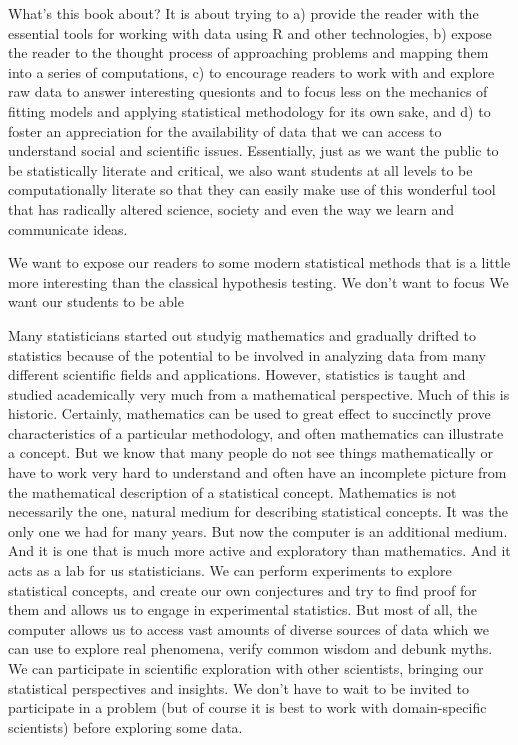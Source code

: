 What's this book about?  It is about trying to a) provide the reader
with the essential tools for working with data using R and other
technologies, b) expose the reader to the thought process of
approaching problems and mapping them into a series of computations,
c) to encourage readers to work with and explore raw data to answer
interesting quesionts and to focus less on the mechanics of fitting
models and applying statistical methodology for its own sake, and d)
to foster an appreciation for the availability of data that we can
access to understand social and scientific issues.  Essentially, just
as we want the public to be statistically literate and critical, we
also want students at all levels to be computationally literate so
that they can easily make use of this wonderful tool that has
radically altered science, society and even the way we learn and
communicate ideas.

We want to expose our readers to some modern statistical
methods that is a little more interesting than the classical
hypothesis testing. We don't want to focus
We want our students to be able 

Many statisticians started out studyig mathematics and gradually
drifted to statistics because of the potential to be involved in
analyzing data from many different scientific fields and applications.
However, statistics is taught and studied academically very much from
a mathematical perspective.  Much of this is historic. Certainly,
mathematics can be used to great effect to succinctly prove
characteristics of a particular methodology, and often mathematics can
illustrate a concept.  But we know that many people do not see things
mathematically or have to work very hard to understand and often have
an incomplete picture from the mathematical description of a
statistical concept.  Mathematics is not necessarily the one, natural
medium for describing statistical concepts.  It was the only one we
had for many years. But now the computer is an additional medium.  And
it is one that is much more active and exploratory than mathematics.
And it acts as a lab for us statisticians.  We can perform experiments
to explore statistical concepts, and create our own conjectures and
try to find proof for them and allows us to engage in experimental
statistics.  But most of all, the computer allows us to access vast
amounts of diverse sources of data which we can use to explore real
phenomena, verify common wisdom and debunk myths.  We can participate
in scientific exploration with other scientists, bringing our
statistical perspectives and insights. We don't have to wait to be
invited to participate in a problem (but of course it is best to work
with domain-specific scientists) before exploring some data.

